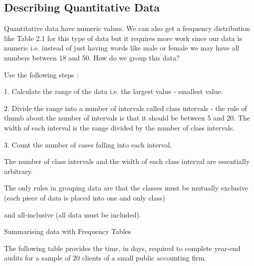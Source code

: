   
 
\subsection{ Describing Quantitative Data }

 

Quantitative data have numeric values. We can also get a frequency distribution like Table 2.1 for this type of data but it requires more work since our data is numeric i.e. instead of just having words like male or female we may have all numbers between 18 and 50. How do we group this data?

 

Use the following steps :

 

1.    Calculate the range of the data i.e. the largest value - smallest value.

 

2.    Divide the range into a number of intervals called class intervals - the rule of thumb about the number of intervals is that it should be between 5 and 20. The width of each interval is the range divided by the number of class intervals.

 

3.    Count the number of cases falling into each interval.


 

The number of class intervals and the width of each class interval are essentially arbitrary.

 

The only rules in grouping data are that the classes must be mutually exclusive (each piece of data is placed into one and only class)

and all-inclusive (all data must be included).

 

Summarising data with Frequency Tables

 

 The following table provides the time, in days, required to complete year-end audits for a sample of 20 clients of a small public accounting firm. 

 

